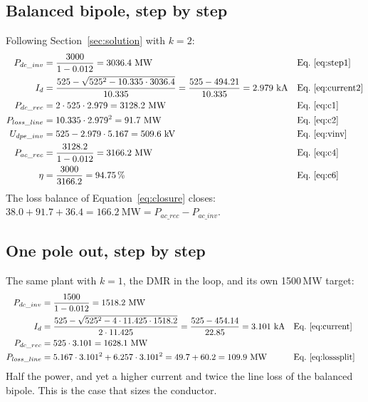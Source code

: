 \subsection{Balanced bipole, step by step}
Following Section~\ref{sec:solution} with $k=2$:
\begin{align*}
  P_{dc\_inv} &= \frac{3000}{1-0.012} = 3036.4\ \mathrm{MW}
              && \text{Eq.~\eqref{eq:step1}} \\
  I_{d}      &= \frac{525 - \sqrt{525^{2} - 10.335\cdot 3036.4}}{10.335}
              = \frac{525 - 494.21}{10.335} = 2.979\ \mathrm{kA}
              && \text{Eq.~\eqref{eq:current2}} \\
  P_{dc\_rec} &= 2\cdot 525 \cdot 2.979 = 3128.2\ \mathrm{MW}
              && \text{Eq.~\eqref{eq:c1}} \\
  P_{loss\_line} &= 10.335 \cdot 2.979^{2} = 91.7\ \mathrm{MW}
              && \text{Eq.~\eqref{eq:c2}} \\
  U_{dpe\_inv}  &= 525 - 2.979\cdot 5.167 = 509.6\ \mathrm{kV}
              && \text{Eq.~\eqref{eq:vinv}} \\
  P_{ac\_rec} &= \frac{3128.2}{1-0.012} = 3166.2\ \mathrm{MW}
              && \text{Eq.~\eqref{eq:c4}} \\
  \eta       &= \frac{3000}{3166.2} = 94.75\,\%
              && \text{Eq.~\eqref{eq:c6}}
\end{align*}
The loss balance of Equation~\eqref{eq:closure} closes:
$38.0 + 91.7 + 36.4 = 166.2\ \mathrm{MW} = P_{ac\_rec}-P_{ac\_inv}$.

\subsection{One pole out, step by step}
The same plant with $k=1$, the DMR in the loop, and its own 1500\,MW target:
\begin{align*}
  P_{dc\_inv} &= \frac{1500}{1-0.012} = 1518.2\ \mathrm{MW} \\
  I_{d}      &= \frac{525 - \sqrt{525^{2} - 4\cdot 11.425\cdot 1518.2}}
                     {2\cdot 11.425}
              = \frac{525 - 454.14}{22.85} = 3.101\ \mathrm{kA}
              && \text{Eq.~\eqref{eq:current}} \\
  P_{dc\_rec} &= 525 \cdot 3.101 = 1628.1\ \mathrm{MW} \\
  P_{loss\_line} &= 5.167\cdot 3.101^{2} + 6.257\cdot 3.101^{2}
                 = 49.7 + 60.2 = 109.9\ \mathrm{MW}
              && \text{Eq.~\eqref{eq:losssplit}}
\end{align*}
Half the power, and yet a higher current and twice the line loss of the
balanced bipole. This is the case that sizes the conductor.

